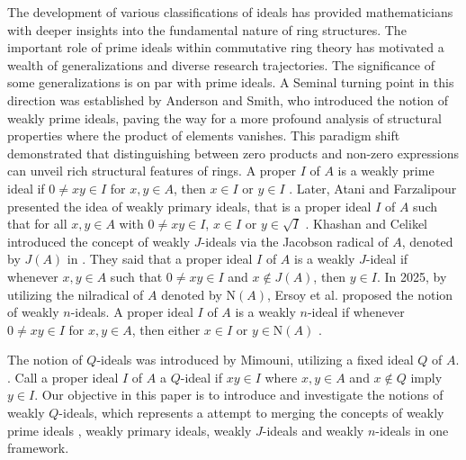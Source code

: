 \documentclass[preprint,review,10pt]{amsart}
\theoremstyle{definition}
\theoremstyle{remark}
\numberwithin{equation}{section}
\begin{document}
The development of various classifications of ideals has provided mathematicians with deeper insights into the fundamental nature of ring structures. The important role of prime ideals within commutative ring theory has motivated a wealth of generalizations and diverse research trajectories. The significance of some generalizations is on par with  prime ideals. A Seminal turning point in this direction was established by Anderson and  Smith, who introduced the notion of weakly prime ideals, paving the way for a more profound analysis of structural properties where the product of elements vanishes.   This paradigm shift demonstrated  that distinguishing between   zero products and  non-zero expressions can unveil rich structural features of  rings. A proper $I$ of $A$ is a weakly prime ideal if $0 \neq xy \in I$ for $x,y \in A$, then $x \in I$ or $y \in I$ \cite{Anderson2}. Later, Atani and Farzalipour presented the idea of weakly primary ideals, that is a proper ideal $I$ of $A$ such that for all $x,y \in A$ with $0 \neq xy \in I$, $x \in I$ or $y \in \sqrt{I}$ \cite{Atani}. Khashan and Celikel introduced the concept of  weakly $J$-ideals via the Jacobson radical  of $A$, denoted by $J(A)$ in \cite{Khashan}. They said that a proper ideal $I$ of $A$ is a weakly $J$-ideal  if whenever $x,y \in A$ such that $0 \neq xy \in I$ and $x \notin J(A)$, then $y \in I$. In 2025, by utilizing  the nilradical  of $A$   denoted by $\text{N}(A)$, Ersoy et al. proposed the notion of weakly $n$-ideals. A proper ideal $I$ of $A$ is a weakly $n$-ideal if whenever $0 \neq xy \in I$ for $x,y \in A$,  then either $x \in I$ or $y \in \text{N}(A)$ \cite{Ersoy}.

The notion of $Q$-ideals was introduced by Mimouni, utilizing a fixed ideal $Q$ of $A$.  \cite{Mimouni}. Call a proper ideal $I$ of $A$ a $Q$-ideal if $xy \in I$ where $x,y \in A$ and $x \notin Q$ imply $y \in I$. Our objective in this paper is to introduce and investigate  the notions of weakly $Q$-ideals, which represents a   attempt to merging the concepts  of weakly prime  ideals , weakly primary ideals, weakly $J$-ideals and weakly $n$-ideals in one framework. 


 
\end{document}
